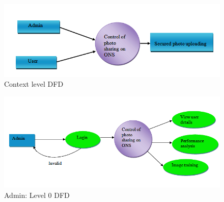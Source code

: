 \begin{figure}[H]
\begin{minipage}[c]{1\linewidth}
\begin{center}
\includegraphics[width=\textwidth]{ndfd1.png}
         \caption[Context Level DFD]{ Context level DFD}
             \label{Posted photo on time line of Social Networking site}
\end{center}
  \end{minipage}            
\end{figure}
\begin{figure}[H]
\begin{minipage}[c]{1\linewidth}
\begin{center}
\includegraphics[width=\textwidth]{ndfd2.png}
        \caption[Admin: level 0 DFD]{ Admin: Level 0 DFD}
             \label{Posted photo on time line of Social Networking site}
\end{center}
  \end{minipage}            
\end{figure}
